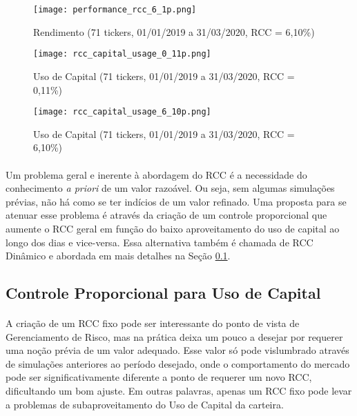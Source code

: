\begin{figure}[!htb] %
    \texttt{[image: performance\_rcc\_6\_1p.png]}
    \centering
    \caption{Rendimento (71 tickers, 01/01/2019 a 31/03/2020, RCC = 6,10\%)}
    \label{fig:552}
\end{figure}

\begin{figure}[!htb] %
    \texttt{[image: rcc\_capital\_usage\_0\_11p.png]}
    \centering
    \caption{Uso de Capital (71 tickers, 01/01/2019 a 31/03/2020, RCC = 0,11\%)}
    \label{fig:789}
\end{figure}

\begin{figure}[!htb] %
    \texttt{[image: rcc\_capital\_usage\_6\_10p.png]}
    \centering
    \caption{Uso de Capital (71 tickers, 01/01/2019 a 31/03/2020, RCC = 6,10\%)}
    \label{fig:790}
\end{figure}

\paragraph{} Um problema geral e inerente à abordagem do RCC é a necessidade do conhecimento \textit{a priori} de um valor razoável. Ou seja, sem algumas simulações prévias, não há como se ter indícios de um valor refinado. Uma proposta para se atenuar esse problema é através da criação de um controle proporcional que aumente o RCC geral em função do baixo aproveitamento do uso de capital ao longo dos dias e vice-versa. Essa alternativa também é chamada de RCC Dinâmico e abordada em mais detalhes na Seção \ref{sub:dynamic_rcc}.



\FloatBarrier
\subsection{Controle Proporcional para Uso de Capital}
\label{sub:dynamic_rcc}

\paragraph{} A criação de um RCC fixo pode ser interessante do ponto de vista de Gerenciamento de Risco, mas na prática deixa um pouco a desejar por requerer uma noção prévia de um valor adequado. Esse valor só pode vislumbrado através de simulações anteriores ao período desejado, onde o comportamento do mercado pode ser significativamente diferente a ponto de requerer um novo RCC, dificultando um bom ajuste. Em outras palavras, apenas um RCC fixo pode levar a problemas de subaproveitamento do Uso de Capital da carteira.


